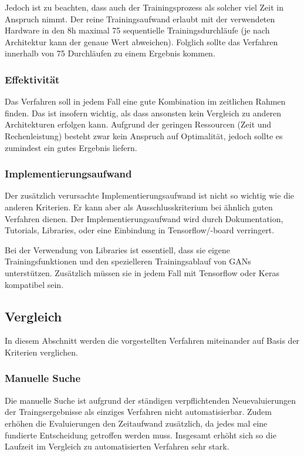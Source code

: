Jedoch ist zu beachten, dass auch der Trainingsprozess als solcher viel Zeit in Anspruch nimmt.
Der reine Trainingsaufwand erlaubt mit der verwendeten Hardware in den 8h maximal 75 sequentielle Trainingsdurchläufe (je nach Architektur kann der genaue Wert abweichen).
Folglich sollte das Verfahren innerhalb von 75 Durchläufen zu einem Ergebnis kommen.

\subsubsection{Effektivität}
Das Verfahren soll in jedem Fall eine gute Kombination im zeitlichen Rahmen finden.
Das ist insofern wichtig, als dass ansonsten kein Vergleich zu anderen Architekturen erfolgen kann.
Aufgrund der geringen Ressourcen (Zeit und Rechenleistung) besteht zwar kein Anspruch auf Optimalität, jedoch sollte es zumindest ein gutes Ergebnis liefern.

\subsubsection{Implementierungsaufwand}
Der zusätzlich verursachte Implementierungsaufwand ist nicht so wichtig wie die anderen Kriterien.
Er kann aber als Ausschlusskriterium bei ähnlich guten Verfahren dienen.
Der Implementierungsaufwand wird durch Dokumentation, Tutorials, Libraries, oder eine Einbindung in Tensorflow/-board verringert.

Bei der Verwendung von Libraries ist essentiell, dass sie eigene Trainingsfunktionen und den spezielleren Trainingsablauf von GANs unterstützen.
Zusätzlich müssen sie in jedem Fall mit Tensorflow oder Keras kompatibel sein.

\subsection{Vergleich}
In diesem Abschnitt werden die vorgestellten Verfahren miteinander auf Basis der Kriterien verglichen.

\subsubsection{Manuelle Suche}
Die manuelle Suche ist aufgrund der ständigen verpflichtenden Neuevaluierungen der Traingsergebnisse als einziges Verfahren  nicht automatisierbar.
Zudem erhöhen die Evaluierungen den Zeitaufwand zusätzlich, da jedes mal eine fundierte Entscheidung getroffen werden muss.
Insgesamt erhöht sich so die Laufzeit im Vergleich zu automatisierten Verfahren sehr stark.
\newline

